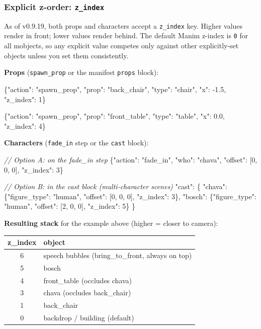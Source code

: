 \documentclass[
  12pt,
  letterpaper,
]{book}
\newenvironment{Shaded}{}{}
\newcommand{\CommentTok}[1]{\textcolor[rgb]{0.38,0.63,0.69}{\textit{#1}}}
\newcommand{\NormalTok}[1]{#1}
\begin{document}
\subsubsection{Explicit z-order: \texttt{z\_index}}\label{explicit-z-order}

As of v0.9.19, both props and characters accept a \texttt{z\_index} key.
Higher values render in front; lower values render behind. The default
Manim z-index is \texttt{0} for all mobjects, so any explicit value
competes only against other explicitly-set objects unless you set them
consistently.

\textbf{Props} (\texttt{spawn\_prop} or the manifest \texttt{props}
block):

\begin{Shaded}
\begin{Highlighting}[]
\NormalTok{\{"action": "spawn\_prop", "prop": "back\_chair", "type": "chair",}
\NormalTok{ "x": -1.5, "z\_index": 1\}}

\NormalTok{\{"action": "spawn\_prop", "prop": "front\_table", "type": "table",}
\NormalTok{ "x": 0.0, "z\_index": 4\}}
\end{Highlighting}
\end{Shaded}

\textbf{Characters} (\texttt{fade\_in} step or the \texttt{cast} block):

\begin{Shaded}
\begin{Highlighting}[]
\CommentTok{// Option A: on the fade\_in step}
\NormalTok{\{"action": "fade\_in", "who": "chava", "offset": [0, 0, 0], "z\_index": 3\}}

\CommentTok{// Option B: in the cast block (multi-character scenes)}
\NormalTok{"cast": \{}
\NormalTok{  "chava": \{"figure\_type": "human", "offset": [0, 0, 0], "z\_index": 3\},}
\NormalTok{  "bosch": \{"figure\_type": "human", "offset": [2, 0, 0], "z\_index": 5\}}
\NormalTok{\}}
\end{Highlighting}
\end{Shaded}

\textbf{Resulting stack} for the example above (higher = closer to
camera):

\begin{center}
\begin{tabular}{cl}
\textbf{z\_index} & \textbf{object} \\
\hline
6 & speech bubbles (bring\_to\_front, always on top) \\
5 & bosch \\
4 & front\_table (occludes chava) \\
3 & chava (occludes back\_chair) \\
1 & back\_chair \\
0 & backdrop / building (default) \\
\end{tabular}
\end{center}
\end{document}
